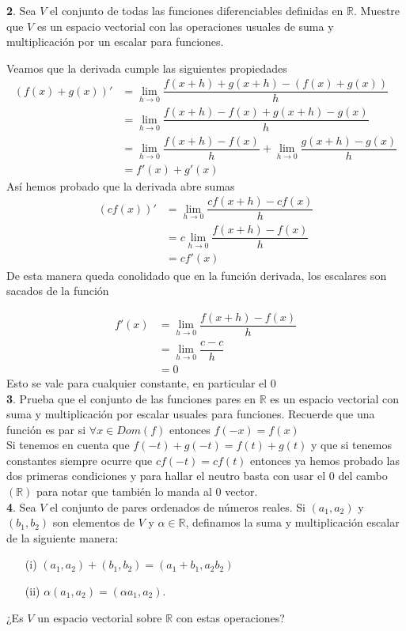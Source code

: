 \documentclass[letterpaper]{article}
\newcommand{\R}{\mathds{R}}
\renewcommand{\*}{\cdot}
\theoremstyle{definition}
\begin{document}
 \noindent \textbf{2}. Sea $V$ el conjunto de todas las funciones diferenciables definidas en $\mathbb{R}$. Muestre que $V$ es un espacio vectorial con las operaciones usuales de suma y multiplicación por un escalar para funciones. 
	
	Veamos que la derivada cumple las siguientes propiedades
	\begin{align*}
	(f(x) + g(x))' &= \lim_{h\to 0} \dfrac{f(x +h) + g(x + h) - (f(x) + g(x))}{h}\\
	& = \lim_{h\to 0} \dfrac{f(x+h) - f(x) + g(x+h) - g(x)}{h}\\
	&= \lim_{h\to 0} \dfrac{f(x+h)-f(x)}{h} + \lim_{h\to 0} \dfrac{g(x+h)-g(x)}{h}\\
	&=f'(x) + g'(x)
	\end{align*}
	Así hemos probado que la derivada abre sumas
	\begin{align*}
	(cf(x))' &= \lim_{h\to 0} \dfrac{cf(x + h) - cf(x)}{h}\\
	& = c\lim_{h\to 0} \dfrac{f(x+h)-f(x)}{h}\\
	&= cf'(x)
	\end{align*}
	De esta manera queda conolidado que en la función derivada, los escalares son sacados de la función
	
	\begin{align*}
	f'(x) &= \lim_{h\to 0} \dfrac{f(x + h) - f(x)}{h}\\
	& = \lim_{h\to 0} \dfrac{c-c}{h}\\
	&= 0
	\end{align*}
	Esto se vale para cualquier constante, en particular el 0\\
	
 \noindent \textbf{3}. Prueba que el conjunto de las funciones pares en $\mathbb{R}$ es un espacio vectorial con suma y multiplicación por escalar usuales para funciones. Recuerde que una función es par si $\forall x \in Dom(f)$ entonces $f(-x) = f(x)$ \\
 	
 	Si tenemos en cuenta que $f(-t) + g(-t) = f(t) + g(t)$ y que si tenemos constantes siempre ocurre que $cf(-t) = cf(t) $ entonces ya hemos probado las dos primeras condiciones y para hallar el neutro basta con usar el 0 del cambo $(\R)$ para notar que también lo manda al 0 vector.\\
 	
\noindent \textbf{4}. Sea $V$ el conjunto de pares ordenados de números reales. Si $(a_{1},a_{2})$ y $(b_{1},b_{2})$ son elementos de $V$ y $\alpha \in \mathbb{R}$, definamos la suma y multiplicación escalar de la siguiente manera:
\begin{enumerate}
\item[(i)] $(a_{1},a_{2}) + (b_{1},b_{2}) = (a_{1} + b_{1}, a_{2}b_{2})$ 
\item[(ii)] $\alpha(a_{1},a_{2}) = (\alpha a_{1},a_{2})$.\\
\end{enumerate}
¿Es $V$ un espacio vectorial sobre $\mathbb{R}$ con estas operaciones?\\
\end{document}
